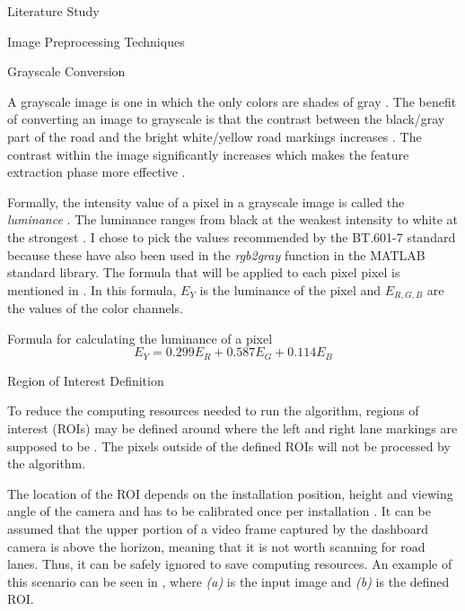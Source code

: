 \documentclass{matthijs}
\begin{document}
\begin{hoofdstuk}{Literature Study}
\begin{paragraaf}{Image Preprocessing Techniques}
			\begin{subparagraaf}{Grayscale Conversion}

				A grayscale image is one in which the only colors are shades of gray \cite{fisher2003hypermedia}.
				The benefit of converting an image to grayscale is that the contrast between the black/gray part of the road and the bright white/yellow road markings increases \cite{tanksale2019finding}.
				The contrast within the image significantly increases which makes the feature extraction phase more effective \cite{ebrahimpour2012vanishing}.

				\bigskip

				Formally, the intensity value of a pixel in a grayscale image is called the \textit{luminance} \cite{itu2017recommendation}.
				The luminance ranges from black at the weakest intensity to white at the strongest \cite{johnson2006stephen}.
				I chose to pick the values recommended by the BT.601-7 standard \cite{itu2017recommendation} because these have also been used in the \textit{rgb2gray} function in the MATLAB standard library.
				The formula that will be applied to each pixel pixel is mentioned in .
				In this formula, $E_Y$ is the luminance of the pixel and $E_{R,G,B}$ are the values of the color channels.

				\begin{figuur}{Formula for calculating the luminance of a pixel}
					\begin{equation*}
						E_Y = 0.299 E_R + 0.587 E_G + 0.114 E_B
					\end{equation*}\cite{itu2017recommendation}
				\end{figuur}
			
			\end{subparagraaf}

			\begin{subparagraaf}{Region of Interest Definition}

				To reduce the computing resources needed to run the algorithm, regions of interest (ROIs) may be defined around where the left and right lane markings are supposed to be \cite{el2020novel}.
				The pixels outside of the defined ROIs will not be processed by the algorithm.
								
				\bigskip

				The location of the ROI depends on the installation position, height and viewing angle of the camera and has to be calibrated once per installation \cite{malmir2019design}.
				It can be assumed that the upper portion of a video frame captured by the dashboard camera is above the horizon, meaning that it is not worth scanning for road lanes.
				Thus, it can be safely ignored to save computing resources.
				An example of this scenario can be seen in , where \textit{(a)} is the input image and \textit{(b)} is the defined ROI.


\end{subparagraaf}
\end{paragraaf}
\end{hoofdstuk}
\end{document}
